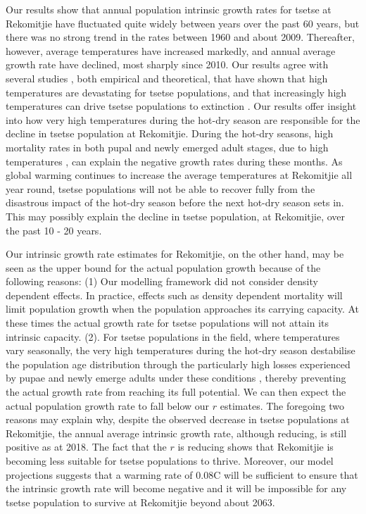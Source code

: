 \documentclass[12pt,a4paper]{article}
\begin{document}
Our results show that annual population intrinsic growth rates for tsetse at Rekomitjie have fluctuated quite widely between years over the past 60 years, but there was no strong trend in the rates between 1960 and about 2009. Thereafter, however, average temperatures have increased markedly, and annual average growth rate have declined, most sharply since 2010.  Our results agree with several studies \cite{Pagabeleguem2016f,Ackley2017}, both empirical and theoretical, that have shown that high temperatures are devastating for tsetse populations, and that increasingly high temperatures can drive tsetse populations to extinction \cite{Lord2018,Are2019}. Our results offer insight into how very high temperatures during the hot-dry season are responsible for the decline in tsetse population at Rekomitjie. During the hot-dry seasons, high mortality rates in both pupal and newly emerged adult stages, due to high temperatures \cite{Ackley2017}, can explain the negative growth rates during these months.  As global warming continues to increase the average temperatures at Rekomitjie all year round, tsetse populations will not be able to recover fully from the disastrous impact of the hot-dry season before the next hot-dry season sets in. This may possibly explain the decline in tsetse population, at Rekomitjie, over the past 10 - 20 years. 

Our intrinsic growth rate estimates for Rekomitjie, on the other hand, may  be seen as the upper bound for the actual population growth because of the following reasons: (1) Our modelling framework did not consider density dependent effects. In practice, effects such as density dependent mortality will limit population growth when the population approaches its carrying capacity. At these times the actual growth rate for tsetse populations will not attain its intrinsic capacity. (2). For tsetse populations in the field, where temperatures vary seasonally, the very high temperatures during the hot-dry season destabilise the population age distribution through the particularly high losses experienced by pupae and newly emerge adults under these conditions  \cite{VanSickle1988,Hargrove2013b}, thereby preventing the actual growth rate from reaching its full potential. We can then expect the actual population growth rate to fall below our $r$ estimates. The foregoing two reasons may explain why, despite the observed decrease in tsetse populations at Rekomitjie, the annual average intrinsic growth rate, although reducing, is still positive as at 2018. The fact that the $r$ is reducing shows that Rekomitjie is becoming less suitable for tsetse populations to thrive. Moreover, our model projections suggests that  a warming rate of 0.08\textdegree C  will be sufficient to ensure that the intrinsic growth rate will become negative and it will be impossible for any tsetse population to survive at Rekomitjie beyond about 2063. 
\end{document}
